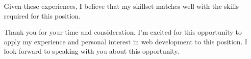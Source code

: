 \documentclass[11pt, a4paper]{awesome-cv}
\begin{document}
\begin{cvletter}
Given these experiences, 
I believe that my skillset matches well with the skills required for this position.

Thank you for your time and consideration.
I'm excited for this opportunity to apply my experience and 
personal interest in web development to this position.
I look forward to speaking with you about this opportunity.

\end{cvletter}


\makeletterclosing
\end{document}
